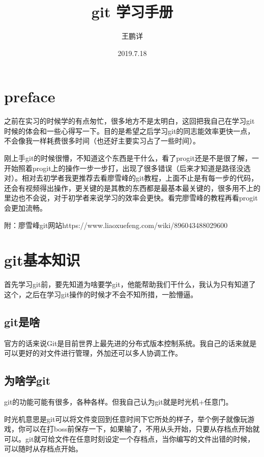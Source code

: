 \documentclass[12pt,a4paper]{article}
\title{git 学习手册}
\author{王鹏详}
\date{2019.7.18}
\begin{document}
	\maketitle
	\tableofcontents
	\newpage

		\section{preface}\setlength{\parindent}{2em}
		之前在实习的时候学的有点匆忙，很多地方不是太明白，这回把我自己在学习git时候的体会和一些心得写一下。目的是希望之后学习git的同志能效率更快一点，不会像我一样耗费很多时间（也还好主要实习占了一些时间）。
		
		刚上手git的时候很懵，不知道这个东西是干什么，看了progit还是不是很了解，一开始照着progit上的操作一步一步打，出现了很多错误（后来才知道是路径没选对）。相对去初学者我更推荐去看廖雪峰的git教程，上面不止是有每一步的代码，还会有视频得出操作，更关键的是其教的东西都是最基本最关键的，很多用不上的里边也不会说，对于初学者来说学习的效率会更快。看完廖雪峰的教程再看progit会更加流畅。
		
		附：廖雪峰git网站https://www.liaoxuefeng.com/wiki/896043488029600

		\section{git基本知识}
		首先学习git前，要先知道为啥要学git，他能帮助我们干什么，我认为只有知道了这个，之后在学习git操作的时候才不会不知所措，一脸懵逼。
		\subsection{git是啥}
	    官方的话来说Git是目前世界上最先进的分布式版本控制系统。我自己的话来就是可以更好的对文件进行管理，外加还可以多人协调工作。
	    \subsection{为啥学git}
	    git的功能可能有很多，各种各样。但我自己认为git就是时光机+任意门。
	    
	    时光机意思是git可以将文件变回到任意时间下它所处的样子，举个例子就像玩游戏，你可以在打boss前保存一下，如果输了，不用从头开始，只要从存档点开始就可以。git就可给文件在任意时刻设定一个存档点，当你编写的文件出错的时候，可以随时从存档点开始。
	    
\end{document}
